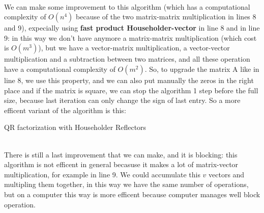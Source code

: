 \documentclass{article}
\begin{document}
\\We can make some improvement to this algorithm (which has a computational complexity of $O(n^4)$ because of the two matrix-matrix multiplication in lines 8 and 9), expecially using \textbf{fast product Householder-vector} in line 8 and in line 9: in this way we don't have anymore a matrix-matrix multiplication (which cost is $O(m^3)$), but we have a vector-matrix multiplication, a vector-vector multiplication and a subtraction between two matrices, and all these operation have a computational complexity of $O(m^2)$. So, to upgrade the matrix A like in line 8, we use this property, and we can also put manually the zeros in the right place and if the matrix is square, we can stop the algorithm 1 step before the full size, because last iteration can only change the sign of last entry. So a more efficent variant of the algorithm is this:
\makeatletter
\def\BState{\State\hskip-\ALG@thistlm}
\makeatother
\begin{algorithm}
\caption{QR factorization with Householder Reflectors}
\end{algorithm}
\\There is still a last improvement that we can make, and it is blocking: this algorithm is not efficent in general becasuse it makes a lot of matrix-vector multiplication, for example in line 9. We could accumulate this $v$ vectors and multipling them together, in this way we have the same number of operations, but on a computer this way is more efficent because computer manages well block operation.
\makeatletter
\def\BState{\State\hskip-\ALG@thistlm}
\makeatother
\end{document}
